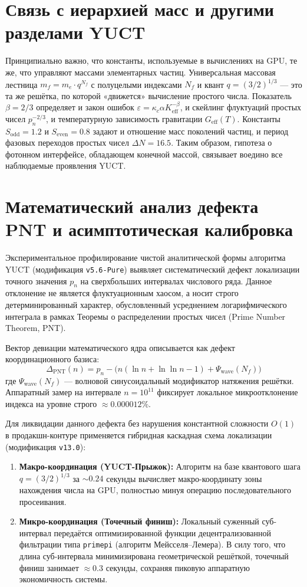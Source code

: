 \documentclass[11pt,a4paper]{article}
\begin{document}
	\section{Связь с иерархией масс и другими разделами YUCT}
	Принципиально важно, что константы, используемые в вычислениях на GPU, те же, что управляют массами элементарных частиц. Универсальная массовая лестница $m_f = m_e \cdot q^{N_f}$ с полуцелыми индексами $N_f$ и квант $q = (3/2)^{1/3}$ — это та же решётка, по которой «движется» вычисление простого числа. Показатель $\beta = 2/3$ определяет и закон ошибок $\varepsilon = \kappa_c \alpha K_{\mathrm{eff}}^{-\beta}$, и скейлинг флуктуаций простых чисел $p_n^{-2/3}$, и температурную зависимость гравитации $G_{\mathrm{eff}}(T)$. Константы $S_{\mathrm{odd}} = 1.2$ и $S_{\mathrm{even}} = 0.8$ задают и отношение масс поколений частиц, и период фазовых переходов простых чисел $\Delta N = 16.5$. Таким образом, гипотеза о фотонном интерфейсе, обладающем конечной массой, связывает воедино все наблюдаемые проявления YUCT.
	
	\section{Математический анализ дефекта PNT и асимптотическая калибровка}
	Экспериментальное профилирование чистой аналитической формы алгоритма YUCT (модификация \texttt{v5.6-Pure}) выявляет систематический дефект локализации точного значения $p_n$ на сверхбольших интервалах числового ряда. Данное отклонение не является флуктуационным хаосом, а носит строго детерминированный характер, обусловленный усреднением логарифмического интеграла в рамках Теоремы о распределении простых чисел (Prime Number Theorem, PNT).
	
	Вектор девиации математического ядра описывается как дефект координационного базиса:
	\begin{equation}
		\Delta_{\mathrm{PNT}}(n) = p_n - \bigl( n(\ln n + \ln\ln n - 1) + \Psi_{\mathrm{wave}}(N_f) \bigr)
	\end{equation}
	где $\Psi_{\mathrm{wave}}(N_f)$ — волновой синусоидальный модификатор натяжения решётки. Аппаратный замер на интервале $n = 10^{11}$ фиксирует локальное микроотклонение индекса на уровне строго $\approx 0.000012\%$.
	
	Для ликвидации данного дефекта без нарушения константной сложности $O(1)$ в продакшн-контуре применяется гибридная каскадная схема локализации (модификация \texttt{v13.0}):
	\begin{enumerate}
		\item \textbf{Макро-координация (YUCT-Прыжок):} Алгоритм на базе квантового шага $q = (3/2)^{1/3}$ за $\sim 0.24$ секунды вычисляет макро-координату зоны нахождения числа на GPU, полностью минуя операцию последовательного просеивания.
		\item \textbf{Микро-координация (Точечный финиш):} Локальный суженный суб-интервал передаётся оптимизированной функции децентрализованной фильтрации типа \texttt{primepi} (алгоритм Мейсселя--Лемера). В силу того, что длина суб-интервала минимизирована геометрической решёткой, точечный финиш занимает $\approx 0.3$ секунды, сохраняя пиковую аппаратную экономичность системы.
	\end{enumerate}
	
\end{document}
